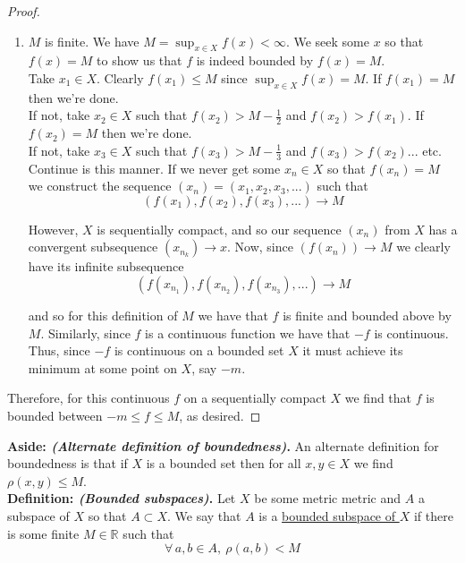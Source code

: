 \documentclass[12pt]{article}
\newlength\tindent
\renewcommand{\indent}{\hspace*{\tindent}}
\newcommand{\R}{\mathbb R}
\begin{document}
\begin{proof}
\begin{enumerate}[{Case} 1:]
	\item $M$ is finite. We have $M = \sup_{x\in X} f(x) < \infty$. We seek some $x$ so that $f(x) = M$ to show us that $f$ is indeed bounded by $f(x) = M$. \\
	
	\indent Take $x_1 \in X$. Clearly $f(x_1) \leq M$ since $\sup_{x\in X} f(x) = M$. If $f(x_1) = M$ then we're done. \\
	
	\indent If not, take $x_2 \in X$ such that $f(x_2) > M - \frac{1}{2}$ and $f(x_2) > f(x_1)$. If $f(x_2) = M$ then we're done. \\
	
	\indent If not, take $x_3 \in X$ such that $f(x_3) > M - \frac{1}{3}$ and $f(x_3) > f(x_2)$... etc. \\
	
	\indent Continue is this manner. If we never get some $x_n \in X$ so that $f(x_n) = M$ we construct the sequence $(x_n) = (x_1, x_2, x_3, ...)$ such that
	\begin{equation*}
		\left( f(x_1), f(x_2), f(x_3), ... \right) \longrightarrow M
	\end{equation*}
	
	\indent However, $X$ is sequentially compact, and so our sequence $(x_n)$ from $X$ has a convergent subsequence $(x_{n_k}) \to x$. Now, since $(f(x_n)) \longrightarrow M$ we clearly have its infinite subsequence 
	\begin{equation*}
	\left( f(x_{n_1}), f(x_{n_2}), f(x_{n_3}), ... \right) \longrightarrow M
	\end{equation*}
	
	and so for this definition of $M$ we have that $f$ is finite and bounded above by $M$. Similarly, since $f$ is a continuous function we have that $-f$ is continuous. Thus, since $-f$ is continuous on a bounded set $X$ it must achieve its minimum at some point on $X$, say $-m$.
\end{enumerate}

\indent Therefore, for this continuous $f$ on a sequentially compact $X$ we find that $f$ is bounded between $-m \leq f \leq M$, as desired.
\end{proof}


%
%
{\bf Aside: {\em (Alternate definition of boundedness)}.} An alternate definition for boundedness is that if $X$ is a bounded set then for all $x, y \in X$ we find $\rho(x, y) \leq M$. \\

%
%
{\bf Definition: {\em (Bounded subspaces)}.} Let $X$ be some metric metric and $A$ a subspace of $X$ so that $A \subset X$. We say that $A$ is a \underline{bounded subspace of $X$} if there is some finite $M \in \R$ such that
\begin{equation*}
	\forall\,a,b\in A,~\rho(a, b) < M
\end{equation*}
\end{document}
